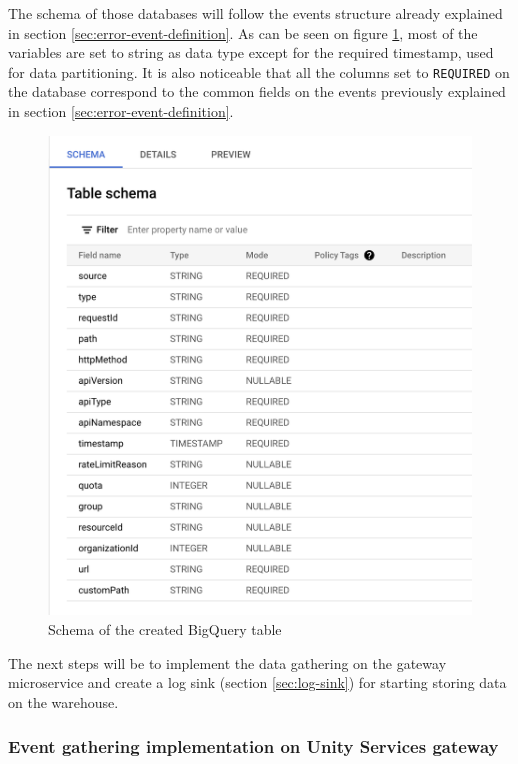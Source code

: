 \documentclass[english, 12pt, a4paper, sci, utf8, a-1b, online]{aaltothesis}
\begin{document}
The schema of those databases will follow the events structure already explained in section \ref{sec:error-event-definition}. As can be seen on figure \ref{fig:bigquery-schema}, most of the variables are set to string as data type except for the required timestamp, used for data partitioning. It is also noticeable that all the columns set to \texttt{REQUIRED} on the database correspond to the common fields on the events previously explained in section \ref{sec:error-event-definition}. \\

\begin{figure}[h!]
    \centering
    \includegraphics[scale=0.3]{src/thesis/img/technical-solution/bigquery-schema.png}
    \caption{Schema of the created BigQuery table}
    \label{fig:bigquery-schema}
\end{figure}

The next steps will be to implement the data gathering on the gateway microservice and create a log sink (section \ref{sec:log-sink}) for starting storing data on the warehouse.

\subsubsection{Event gathering implementation on Unity Services gateway}
\label{sec:event-gathering}
\end{document}
